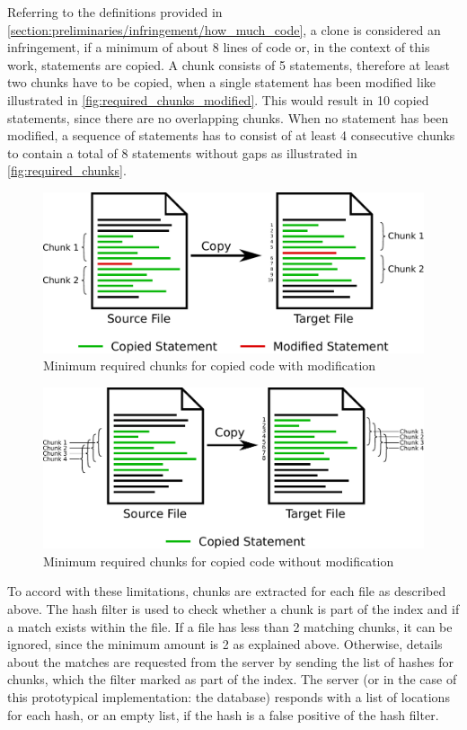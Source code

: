 Referring to the definitions provided in \autoref{section:preliminaries/infringement/how_much_code}, a clone is considered an infringement, if a minimum of about 8 lines of code or, in the context of this work, statements are copied.
A chunk consists of 5 statements, therefore at least two chunks have to be copied, when a single statement has been modified like illustrated in \autoref{fig:required_chunks_modified}.
This would result in 10 copied statements, since there are no overlapping chunks.
When no statement has been modified, a sequence of statements has to consist of at least 4 consecutive chunks to contain a total of 8 statements without gaps as illustrated in \autoref{fig:required_chunks}.

\begin{figure}[h]
	\centering
	\includegraphics[width=0.9\linewidth]{figures/required_chunks_modified.pdf}
	\caption{Minimum required chunks for copied code with modification}\label{fig:required_chunks_modified}
\end{figure}

\begin{figure}[h]
	\centering
	\includegraphics[width=0.9\linewidth]{figures/required_chunks.pdf}
	\caption{Minimum required chunks for copied code without modification}\label{fig:required_chunks}
\end{figure}

To accord with these limitations, chunks are extracted for each file as described above.
The hash filter is used to check whether a chunk is part of the index and if a match exists within the file.
If a file has less than 2 matching chunks, it can be ignored, since the minimum amount is 2 as explained above.
Otherwise, details about the matches are requested from the server by sending the list of hashes for chunks, which the filter marked as part of the index.
The server (or in the case of this prototypical implementation: the database) responds with a list of locations for each hash, or an empty list, if the hash is a false positive of the hash filter.


